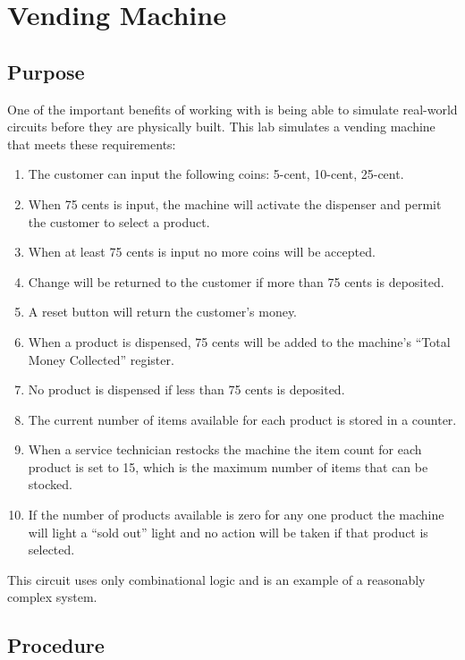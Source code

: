 \chapter{Vending Machine}

\section{Purpose}

One of the important benefits of working with \LE is being able to simulate real-world circuits before they are physically built. This lab simulates a vending machine that meets these requirements:

\begin{enumerate}
	\item The customer can input the following coins: 5-cent, 10-cent, 25-cent.
	\item When 75 cents is input, the machine will activate the dispenser and permit the customer to select a product.
	\item When at least 75 cents is input no more coins will be accepted.
	\item Change will be returned to the customer if more than 75 cents is deposited.
	\item A reset button will return the customer's money.
	\item When a product is dispensed, 75 cents will be added to the machine's ``Total Money Collected'' register.
	\item No product is dispensed if less than 75 cents is deposited.
	\item The current number of items available for each product is stored in a counter.
	\item When a service technician restocks the machine the item count for each product is set to 15, which is the maximum number of items that can be stocked.
	\item If the number of products available is zero for any one product the machine will light a ``sold out'' light and no action will be taken if that product is selected.
\end{enumerate}

This circuit uses only combinational logic and is an example of a reasonably complex system. 

\section{Procedure}


